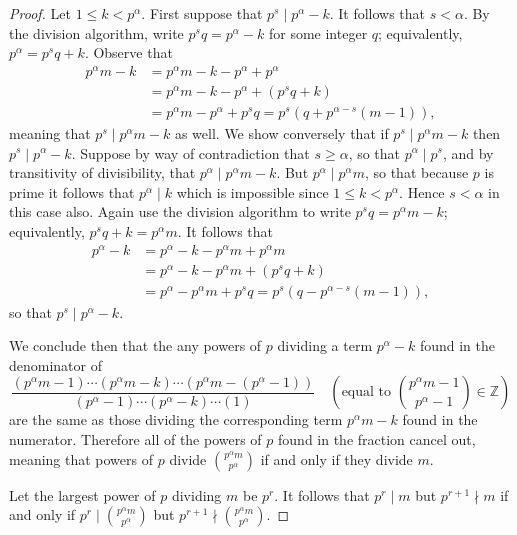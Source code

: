 \documentclass[11pt]{article}
\newcommand{\br}[1]{\left(#1\right)}
\begin{document}
\begin{proof}
    Let $1\leq k < p^{\alpha}$. First suppose that $p^s\mid p^\alpha - k$. It follows that $s< \alpha$. By the division algorithm, write $p^sq = p^\alpha - k$ for some integer $q$; equivalently, $p^\alpha = p^sq+k$. Observe that \begin{align*}
        p^\alpha m - k &= p^\alpha m - k - p^\alpha + p^\alpha\\
        &= p^\alpha m - k - p^\alpha + (p^sq+k)\\
        &=p^\alpha m - p^\alpha + p^sq = p^s(q+p^{\alpha-s}(m-1)),
    \end{align*} meaning that $p^s\mid p^\alpha m -k$ as well. We show conversely that if $p^s\mid p^\alpha m -k$ then $p^s\mid p^\alpha -k$. Suppose by way of contradiction that $s \geq \alpha$, so that $p^\alpha\mid p^s$, and by transitivity of divisibility, that $p^\alpha \mid p^\alpha m -k$. But $p^\alpha\mid p^\alpha m$, so that because $p$ is prime it follows that $p^\alpha\mid k$ which is impossible since $1\leq k < p^{\alpha}$. Hence $s < \alpha$ in this case also. Again use the division algorithm to write $p^sq = p^\alpha m -k$; equivalently, $p^sq + k = p^\alpha m$. It follows that \begin{align*}
        p^\alpha - k &= p^\alpha - k -p^\alpha m + p^\alpha m\\
        &= p^\alpha - k -p^\alpha m + (p^sq + k)\\
        &= p^\alpha - p^\alpha m + p^sq = p^s(q - p^{\alpha - s}(m-1)),
    \end{align*} so that $p^s\mid p^\alpha - k$.

    We conclude then that the any powers of $p$ dividing a term $p^\alpha - k$ found in the denominator of \[\frac{(p^\alpha m - 1)\cdots (p^\alpha m - k)\cdots (p^\alpha m - (p^\alpha - 1))}{(p^\alpha - 1)\cdots (p^\alpha - k) \cdots (1)} \quad \br{\text{equal to } \binom{p^\alpha m-1}{p^\alpha-1}\in\mathbb{Z}}\] are the same as those dividing the corresponding term $p^\alpha m - k$ found in the numerator. Therefore all of the powers of $p$ found in the fraction cancel out, meaning that powers of $p$ divide $\binom{p^\alpha m}{p^\alpha}$ if and only if they divide $m$.
    
    Let the largest power of $p$ dividing $m$ be $p^r$. It follows that $p^r\mid m$ but $p^{r+1}\nmid m$ if and only if $p^r\mid \binom{p^\alpha m}{p^\alpha}$ but $p^{r+1}\nmid \binom{p^\alpha m}{p^\alpha}$.
\end{proof}
\end{document}
